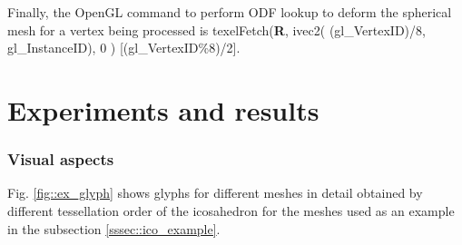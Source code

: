\documentclass[twoside,twocolumn,10pt]{article}
\begin{document}
Finally, the OpenGL command to perform ODF lookup to deform the spherical mesh for a vertex being processed is texelFetch(\textbf{R}, ivec2( (gl\_VertexID)/8, gl\_InstanceID), 0 ) [(gl\_VertexID\%8)/2].

















\section{Experiments and results}

\label{sec::results}

\subsubsection{Visual aspects}

Fig. \ref{fig::ex_glyph} shows glyphs for different meshes in detail obtained by different tessellation order of the icosahedron for the meshes used as an example in the subsection \ref{sssec::ico_example}.
\end{document}
